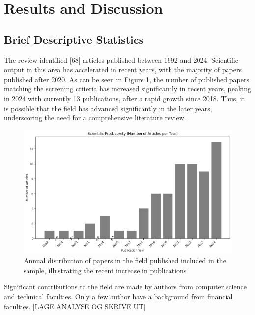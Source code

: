 \section{Results and Discussion}
\label{sec:result_and_discussion}


\subsection{Brief Descriptive Statistics}
The review identified [68] articles published between 1992 and 2024. Scientific output in this area has accelerated in recent years, with the majority of papers published after 2020. As can be seen in Figure \ref{fig:scientific_productivity}, the number of published papers matching the screening criteria has increased significantly in recent years, peaking in 2024 with currently 13 publications, after a rapid growth since 2018. Thus, it is possible that the field has advanced significantly in the later years, underscoring the need for a comprehensive literature review.

\begin{figure}[H]
    \centering
    \includegraphics[width=1\linewidth]{Images/scientific_productivity.png}
    \caption{Annual distribution of papers in the field published included in the sample, illustrating the recent increase in publications}
    \label{fig:scientific_productivity}
\end{figure}

Significant contributions to the field are made by authors from computer science and technical  faculties. Only a few author have a background from financial faculties. [LAGE ANALYSE OG SKRIVE UT]

